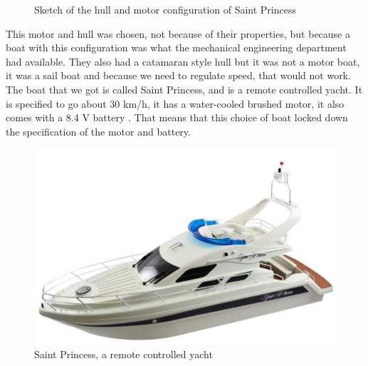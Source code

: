 \begin{figure}[H]
	\centering
	\hfill
	\caption{Sketch of the hull and motor configuration of Saint Princess}
\end{figure}
This motor and hull was chosen, not because of their properties, but because a boat with this configuration was what the mechanical engineering department had available. They also had a catamaran style hull but it was not a motor boat, it was a sail boat and because we need to regulate speed, that would not work. The boat that we got is called Saint Princess, and is a remote controlled yacht. It is specified to go about 30 km/h, it has a water-cooled brushed motor, it also comes with a 8.4 V battery \cite{saint_princess}. That means that this choice of boat locked down the specification of the motor and battery.

\begin{figure}[H]
\centering
\includegraphics[width=0.7\linewidth]{Images/Design/saint_princess}
\caption{Saint Princess, a remote controlled yacht\cite{saint_princess}}
\label{fig:saintprincess}
\end{figure}


